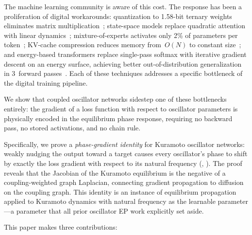 \documentclass[11pt,a4paper]{article}
\begin{document}
The machine learning community is aware of this cost. The response has been
a proliferation of digital workarounds: quantization to 1.58-bit ternary
weights eliminates matrix multiplication~\citep{ma2024era}; state-space
models replace quadratic attention with linear
dynamics~\citep{gu2023mamba}; mixture-of-experts activates only 2\% of
parameters per token~\citep{shazeer2017outrageously}; KV-cache compression
reduces memory from~$O(N)$ to constant size~\citep{liu2024deepseek}; and
energy-based transformers replace single-pass softmax with iterative
gradient descent on an energy surface, achieving better out-of-distribution
generalization in 3~forward passes~\citep{gladstone2025energy}. Each of these techniques addresses a specific bottleneck of the digital
training pipeline.

We show that coupled oscillator networks sidestep one of these
bottlenecks entirely: the gradient of a loss function with respect to
oscillator parameters is physically encoded in the equilibrium phase
response, requiring no backward pass, no stored activations, and no
chain rule.

Specifically, we prove a \emph{phase-gradient identity} for Kuramoto
oscillator networks: weakly nudging the output toward a target causes every
oscillator's phase to shift by exactly the loss gradient with respect to
its natural frequency (, ). The proof reveals that
the Jacobian of the Kuramoto equilibrium is the negative of a
coupling-weighted graph Laplacian, connecting gradient propagation to
diffusion on the coupling graph. This identity is an instance of equilibrium
propagation~\citep{scellier2017equilibrium} applied to Kuramoto dynamics
with natural frequency as the learnable parameter---a parameter that all
prior oscillator EP work explicitly set aside.

This paper makes three contributions:
\end{document}
